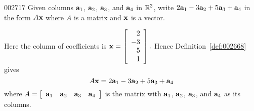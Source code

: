 \begin{example}{}{002717}
Given columns $\textbf{a}_{1}$, $\textbf{a}_{2}$, $\textbf{a}_{3}$, and $\textbf{a}_{4}$ in $\mathbb{R}^3$, write $2\textbf{a}_{1} - 3\textbf{a}_{2} + 5\textbf{a}_{3} + \textbf{a}_{4}$ in the form $A\textbf{x}$ where $A$ is a matrix and $\textbf{x}$ is a vector.


\begin{solution}
  Here the column of coefficients is 
  $
  \textbf{x} = \left[ \begin{array}{r}
  2 \\
  -3 \\
  5 \\
  1
  \end{array} \right]. $
 Hence Definition~\ref{def:002668} gives
\begin{equation*}
A\textbf{x} = 2\textbf{a}_{1} - 3\textbf{a}_{2} + 5\textbf{a}_{3} + \textbf{a}_{4}
\end{equation*}
where $A = \left[ \begin{array}{cccc}
\textbf{a}_{1} & \textbf{a}_{2} & \textbf{a}_{3} & \textbf{a}_{4}
\end{array} \right]$ is the matrix with $\textbf{a}_{1}$, $\textbf{a}_{2}$, $\textbf{a}_{3}$, and $\textbf{a}_{4}$ as its columns.
\end{solution}
\end{example}


